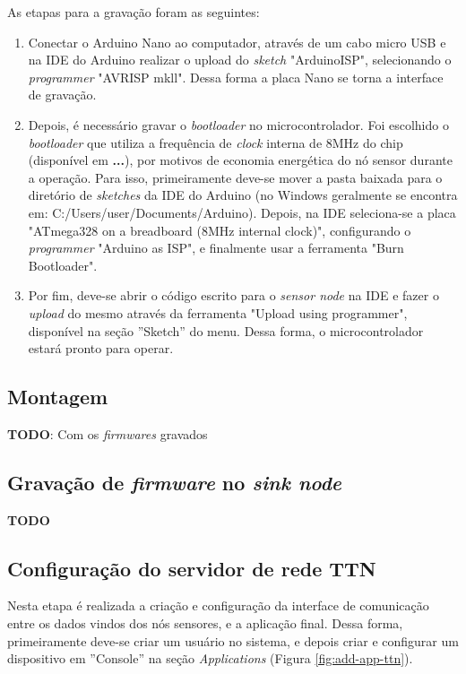 \documentclass[oneside,openright,12pt]{ufsm_2015} %
\begin{document}
    As etapas para a gravação foram as seguintes:
    \begin{enumerate}
        \item Conectar o Arduino Nano ao computador, através de um cabo micro USB e na IDE do Arduino realizar o upload do \textit{sketch} "ArduinoISP", selecionando o \textit{programmer} "AVRISP mkll". Dessa forma a placa Nano se torna a interface de gravação.
        \item Depois, é necessário gravar o \textit{bootloader} no microcontrolador. Foi escolhido o \textit{bootloader} que utiliza a frequência de \textit{clock} interna de 8MHz do chip (disponível em \textbf{...}), por motivos de economia energética do nó sensor durante a operação. Para isso, primeiramente deve-se mover a pasta baixada para o diretório de \textit{sketches} da IDE do Arduino (no Windows geralmente se encontra em: C:/Users/user/Documents/Arduino). Depois, na IDE seleciona-se a placa "ATmega328 on a breadboard (8MHz internal clock)", configurando o \textit{programmer} "Arduino as ISP", e finalmente usar a ferramenta "Burn Bootloader".
        \item Por fim, deve-se abrir o código escrito para o \textit{sensor node} na IDE e fazer o \textit{upload} do mesmo através da ferramenta "Upload using programmer", disponível na seção ''Sketch'' do menu. Dessa forma, o microcontrolador estará pronto para operar.
    \end{enumerate}
    
    \subsection{Montagem}
    \textbf{TODO}: Com os \textit{firmwares} gravados
    
    \subsection{Gravação de \textit{firmware} no \textit{sink node}}
    \textbf{TODO}
    
    \subsection{Configuração do servidor de rede TTN}
    Nesta etapa é realizada a criação e configuração da interface de comunicação entre os dados vindos dos nós sensores, e a aplicação final. Dessa forma, primeiramente deve-se criar um usuário no sistema, e depois criar e configurar um dispositivo em ''Console'' na seção \textit{Applications} (Figura \ref{fig:add-app-ttn}). 
    
\end{document}
